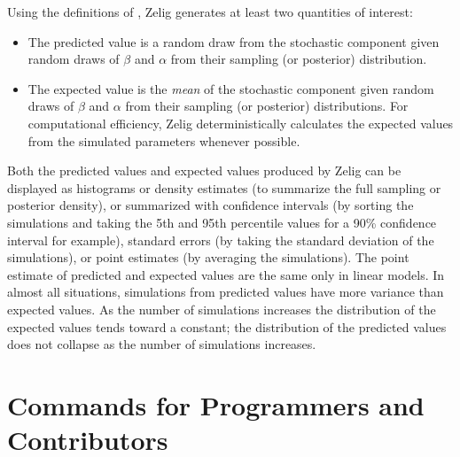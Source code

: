 \documentclass{article}
\begin{document}
Using the definitions of ,
  \nocite{KinTomWit00}
Zelig generates at least two quantities of interest:   
\begin{itemize}
\item The predicted value is a random draw from the stochastic component
  given random draws of $\beta$ and $\alpha$ from their sampling (or
  posterior) distribution.  
\item The expected value is the \emph{mean} of the stochastic component
  given random draws of $\beta$ and $\alpha$ from their sampling (or
  posterior) distributions.  For computational efficiency, Zelig
  deterministically calculates the expected values from the simulated
  parameters whenever possible. 
\end{itemize}

Both the predicted values and expected values produced by Zelig can be
displayed as histograms or density estimates (to summarize the full
sampling or posterior density), or summarized with confidence
intervals (by sorting the simulations and taking the 5th and 95th
percentile values for a 90\% confidence interval for example),
standard errors (by taking the standard deviation of the simulations),
or point estimates (by averaging the simulations).  The point estimate
of predicted and expected values are the same only in linear models.
In almost all situations, simulations from predicted values have more
variance than expected values.  As the number of simulations increases
the distribution of the expected values tends toward a constant; the
distribution of the predicted values does not collapse as the number
of simulations increases.











\chapter{Commands for Programmers and Contributors}












\end{document}
